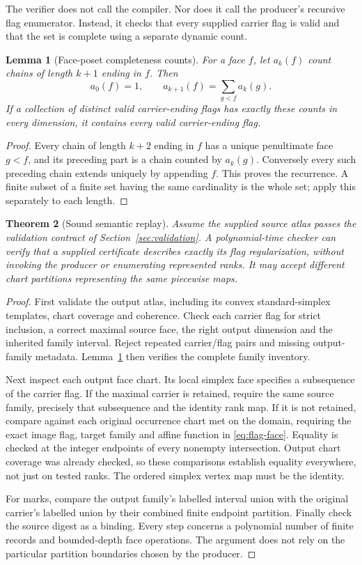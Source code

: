 \documentclass[11pt]{article}
\newtheorem{theorem}{Theorem}[section]
\newtheorem{lemma}[theorem]{Lemma}
\theoremstyle{definition}\newtheorem{definition}[theorem]{Definition}
\theoremstyle{remark}\newtheorem{remark}[theorem]{Remark}
\begin{document}
The verifier does not call the compiler. Nor does it call the producer's recursive flag enumerator. Instead, it checks that every supplied carrier flag is valid and that the set is complete using a separate dynamic count.

\begin{lemma}[Face-poset completeness counts]\label{lem:counts}
For a face \(f\), let \(a_k(f)\) count chains of length \(k+1\) ending in \(f\). Then
\[
 a_0(f)=1,\qquad a_{k+1}(f)=\sum_{g<f}a_k(g).
\]
If a collection of distinct valid carrier-ending flags has exactly these counts in every dimension, it contains every valid carrier-ending flag.
\end{lemma}
\begin{proof}
Every chain of length \(k+2\) ending in \(f\) has a unique penultimate face \(g<f\), and its preceding part is a chain counted by \(a_k(g)\). Conversely every such preceding chain extends uniquely by appending \(f\). This proves the recurrence. A finite subset of a finite set having the same cardinality is the whole set; apply this separately to each length.
\end{proof}

\begin{theorem}[Sound semantic replay]\label{thm:replay}
Assume the supplied source atlas passes the validation contract of Section~\ref{sec:validation}. A polynomial-time checker can verify that a supplied certificate describes exactly its flag regularization, without invoking the producer or enumerating represented ranks. It may accept different chart partitions representing the same piecewise maps.
\end{theorem}
\begin{proof}
First validate the output atlas, including its convex standard-simplex templates, chart coverage and coherence. Check each carrier flag for strict inclusion, a correct maximal source face, the right output dimension and the inherited family interval. Reject repeated carrier/flag pairs and missing output-family metadata. Lemma~\ref{lem:counts} then verifies the complete family inventory.

Next inspect each output face chart. Its local simplex face specifies a subsequence of the carrier flag. If the maximal carrier is retained, require the same source family, precisely that subsequence and the identity rank map. If it is not retained, compare against each original occurrence chart met on the domain, requiring the exact image flag, target family and affine function in \eqref{eq:flag-face}. Equality is checked at the integer endpoints of every nonempty intersection. Output chart coverage was already checked, so these comparisons establish equality everywhere, not just on tested ranks. The ordered simplex vertex map must be the identity.

For marks, compare the output family's labelled interval union with the original carrier's labelled union by their combined finite endpoint partition. Finally check the source digest as a binding. Every step concerns a polynomial number of finite records and bounded-depth face operations. The argument does not rely on the particular partition boundaries chosen by the producer.
\end{proof}
\end{document}
